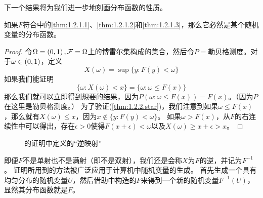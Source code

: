 \documentclass[main.tex]{subfiles}
\begin{document}
下一个结果将为我们进一步地刻画分布函数的性质。

\begin{theorem} \label{thm:1.2.2}
	如果\(F\)符合中的\ref{thm:1.2.1.1}、\ref{thm:1.2.1.2}和\ref{thm:1.2.1.3}，那么它必然是某个随机变量的分布函数。
\end{theorem}
\begin{proof}
	令\(\Omega = \intoo{0,1}, \mathcal{F}=\Omega\)上的博雷尔集构成的集合，然后令\(P=\)勒贝格测度。对于\(\omega \in \intoo{0,1}\)，定义
	\[X(\omega) = \sup\{y:F(y) < \omega\}\]
	如果我们能证明
	\[\tag{$\star$}\label{thm:1.2.2.star}\{\omega: X(\omega) < x\} = \{\omega:\omega\leq F(x)\}\]
	那么我们就可以立即得到想要的结果，因为\(P(\omega:\omega\leq F(x)) = F(x)\)。（因为\(P\)在这里是勒贝格测度。）
	为了验证(\ref{thm:1.2.2.star})，我们注意到如果\(\omega\leq F(x)\)，那么就有\(X(\omega) \leq x\)，因为\(x \notin \{y: F(y) < \omega\}\)。
	如果\(\omega > F(x)\)，从\(F\)的右连续性中可以得出，存在\(\epsilon > 0\)使得\(F(x+\epsilon) < \omega\)以及\(X(\omega) \geq x+\epsilon > x\)。
\end{proof}
\begin{figure}
\centering
{}
\caption{的证明中定义的``逆映射''}
\end{figure}

即便\(F\)不是单射也不是满射（即不是双射），我们还是会称\(X\)为\(F\)的逆，并记为\(F^{-1}\)。
证明所用到的方法被广泛应用于计算机中随机变量的生成。
首先生成一个具有均匀分布的随机变量\(U\)，然后借助中构造的\(F\)来得到一个新的随机变量\(F^{-1}(U)\)，显然其分布函数就是\(F\)。
\end{document}
